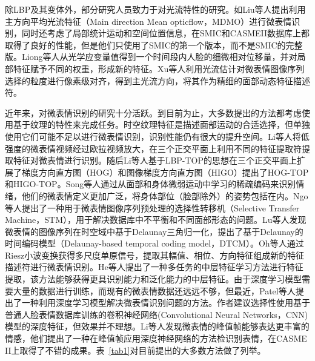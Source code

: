 除LBP及其变体外，部分研究人员致力于对光流特性的研究。如Liu等人提出利用主方向平均光流特征（Main direction Mean opticflow，MDMO）进行微表情识别，同时还考虑了局部统计运动和空间位置信息，在SMIC和CASMEII数据库上都取得了良好的性能，但是他们只使用了SMIC的第一个版本，而不是SMIC的完整版\citep{liu2016mainl}。Liong等人从光学应变量值得到一个时间段内人脸的细微相对位移量，并对局部特征赋予不同的权重，形成新的特征\citep{liong2014subtle}。Xu等人利用光流估计对微表情图像序列选择的粒度进行像素级对齐，得到主光流方向，将其作为精细的面部动态特征描述符\citep{xu2017microexpression}。

近年来，对微表情识别的研究十分活跃。到目前为止，大多数提出的方法都考虑使用基于纹理的特性来完成任务。时空纹理特征是描述面部运动的合适选择，但单独使用它们可能不足以进行微表情识别，识别性能仍有很大的提升空间。Li等人将低强度的微表情视频经过欧拉视频放大，在三个正交平面上利用不同的特征提取符提取特征对微表情进行识别。随后Li等人基于LBP-TOP的思想在三个正交平面上扩展了梯度方向直方图（HOG）和图像梯度方向直方图（HIGO）提出了HOG-TOP和HIGO-TOP。Song等人通过从面部和身体微弱运动中学习的稀疏编码来识别情绪，他们的微表情定义更加广泛，将身体部位（脸部除外）的姿势包括在内\citep{Song2013Learning}。Ngo等人提出了一种用于微表情图像序列预处理的选择性转移机（Selective Transfer Machine，STM），用于解决数据库中不平衡和不同面部形态的问题\citep{le2014spontaneous}。Lu等人发现微表情的图像序列在时空域中基于Delaunay三角归一化，提出了基于Delaunay的时间编码模型（Delaunay-based temporal coding model，DTCM）\citep{lu2014delaunay}。Oh等人通过Riesz小波变换获得多尺度单原信号，提取其幅值、相位、方向特征组成新的特征描述符进行微表情识别\citep{oh2015monogenic}。He等人提出了一种多任务的中层特征学习方法进行特征提取，该方法能够获得更具识别能力和泛化能力的中层特征\citep{he2017multi}。由于深度学习模型需要大量的数据进行训练，而现有的微表情数据还远远不够，但最近，Patel等人提出了一种利用深度学习模型解决微表情识别问题的方法\citep{Patel2016Selective}。作者建议选择性使用基于普通人脸表情数据库训练的卷积神经网络(Convolutional Neural Networks，CNN)模型的深度特征，但效果并不理想。Li等人发现微表情的峰值帧能够表达更丰富的情感，他们提出了一种在峰值帧应用深度神经网络的方法检识别表情，在CASME II上取得了不错的成果\citep{canYan18}。表~\ref{tab1}对目前提出的大多数方法做了列举。

